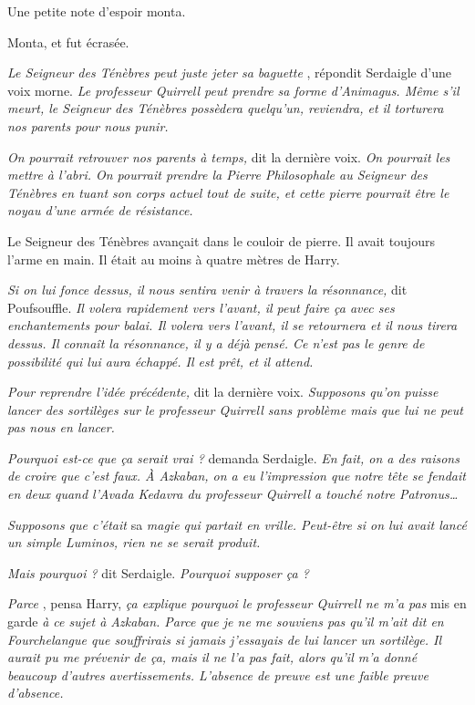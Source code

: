 Une petite note d'espoir monta.

Monta, et fut écrasée.

\emph{Le Seigneur des Ténèbres peut juste jeter sa baguette} , répondit Serdaigle d'une voix morne. \emph{Le professeur Quirrell peut prendre sa forme d'Animagus. Même s'il meurt, le Seigneur des Ténèbres possèdera quelqu'un, reviendra, et il torturera nos parents pour nous punir.} 

\emph{On pourrait retrouver nos parents à temps,}  dit la dernière voix. \emph{On pourrait les mettre à l'abri. On pourrait prendre la Pierre Philosophale au Seigneur des Ténèbres en tuant son corps actuel tout de suite, et cette pierre pourrait être le noyau d'une armée de résistance.} 

Le Seigneur des Ténèbres avançait dans le couloir de pierre. Il avait toujours l'arme en main. Il était au moins à quatre mètres de Harry.

\emph{Si on lui fonce dessus, il nous sentira venir à travers la résonnance,}  dit Poufsouffle. \emph{Il volera rapidement vers l'avant, il peut faire ça avec ses enchantements pour balai. Il volera vers l'avant, il se retournera et il nous tirera dessus. Il connaît la résonnance, il y a déjà pensé. Ce n'est pas le genre de possibilité qui lui aura échappé. Il est prêt, et il attend.} 

\emph{Pour reprendre l'idée précédente,}  dit la dernière voix. \emph{Supposons qu'on puisse lancer des sortilèges sur le professeur Quirrell sans problème mais que lui ne peut pas nous en lancer.} 

\emph{Pourquoi est-ce que ça serait vrai ?}  demanda Serdaigle. \emph{En fait, on a des raisons de croire que c'est faux. À Azkaban, on a eu l'impression que notre tête se fendait en deux quand l'Avada Kedavra du professeur Quirrell a touché notre Patronus…} 

\emph{Supposons que c'était}  sa \emph{magie qui partait en vrille. Peut-être si on lui avait lancé un simple Luminos, rien ne se serait produit.} 

\emph{Mais pourquoi ?}  dit Serdaigle. \emph{Pourquoi supposer ça ?} 

\emph{Parce} , pensa Harry, \emph{ça explique pourquoi le professeur Quirrell ne m'a pas}  mis en garde \emph{à ce sujet à Azkaban. Parce que je ne me souviens pas qu'il m'ait dit en Fourchelangue que souffrirais si jamais j'essayais de lui lancer un sortilège. Il aurait pu me prévenir de ça, mais il ne l'a pas fait, alors qu'il m'a donné beaucoup d'autres avertissements. L'absence de preuve est une faible preuve d'absence.} 

